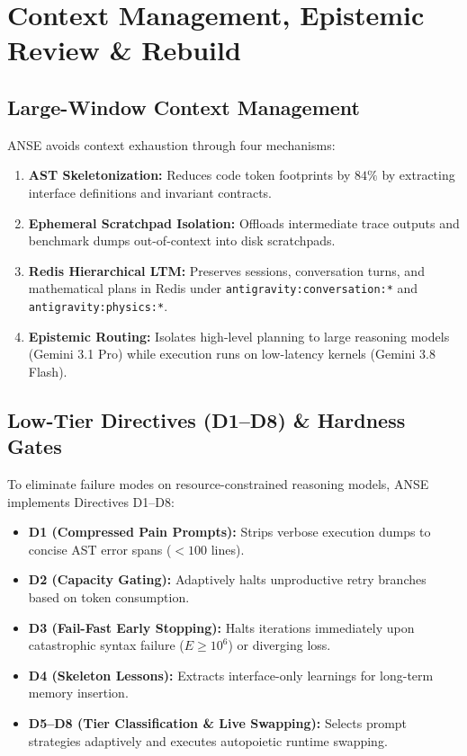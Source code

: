 \documentclass[10pt,journal,compsoc]{IEEEtran}
\theoremstyle{definition}
\begin{document}
\section{Context Management, Epistemic Review \& Rebuild}

\subsection{Large-Window Context Management}
ANSE avoids context exhaustion through four mechanisms:
\begin{enumerate}
    \item \textbf{AST Skeletonization:} Reduces code token footprints by $84\%$ by extracting interface definitions and invariant contracts.
    \item \textbf{Ephemeral Scratchpad Isolation:} Offloads intermediate trace outputs and benchmark dumps out-of-context into disk scratchpads.
    \item \textbf{Redis Hierarchical LTM:} Preserves sessions, conversation turns, and mathematical plans in Redis under \texttt{antigravity:conversation:*} and \texttt{antigravity:physics:*}.
    \item \textbf{Epistemic Routing:} Isolates high-level planning to large reasoning models (Gemini 3.1 Pro) while execution runs on low-latency kernels (Gemini 3.8 Flash).
\end{enumerate}

\subsection{Low-Tier Directives (D1–D8) \& Hardness Gates}
To eliminate failure modes on resource-constrained reasoning models, ANSE implements Directives D1–D8:
\begin{itemize}
    \item \textbf{D1 (Compressed Pain Prompts):} Strips verbose execution dumps to concise AST error spans ($<100$ lines).
    \item \textbf{D2 (Capacity Gating):} Adaptively halts unproductive retry branches based on token consumption.
    \item \textbf{D3 (Fail-Fast Early Stopping):} Halts iterations immediately upon catastrophic syntax failure ($E \ge 10^6$) or diverging loss.
    \item \textbf{D4 (Skeleton Lessons):} Extracts interface-only learnings for long-term memory insertion.
    \item \textbf{D5–D8 (Tier Classification \& Live Swapping):} Selects prompt strategies adaptively and executes autopoietic runtime swapping.
\end{itemize}
\end{document}
